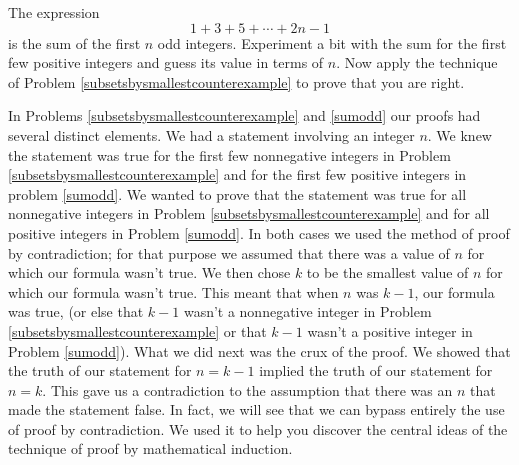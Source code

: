 \item The expression\label{sumodd}
$$1+3+5+\cdots+2n-1$$
is the sum of the first $n$ odd integers.  Experiment a bit with the sum
for the first few positive integers and guess its value in terms of $n$. 
Now apply the technique of Problem
\ref{subsetsbysmallestcounterexample} to prove that you are right.

\ep

In Problems \ref{subsetsbysmallestcounterexample} and \ref{sumodd} our
proofs had several distinct elements.  We had a statement involving an
integer $n$.  We knew the statement was true for the first few
nonnegative integers in Problem \ref{subsetsbysmallestcounterexample} and
for the first few positive integers in problem \ref{sumodd}.  We wanted
to prove that the statement was true for all nonnegative integers in
Problem \ref{subsetsbysmallestcounterexample} and for all positive
integers in Problem \ref{sumodd}.  In both cases we used the method of
proof by contradiction; for that purpose we assumed that there was a value
of
$n$ for which our formula wasn't true.  We then chose $k$ to be the
smallest value of $n$ for which our formula wasn't true.  This meant that
when $n$ was $k-1$, our formula was true, (or else that $k-1 $ wasn't a
nonnegative integer in Problem \ref{subsetsbysmallestcounterexample} or
that $k-1$ wasn't a positive integer in Problem \ref{sumodd}).  What we
did next was the crux of the proof.  We showed that the truth of our
statement for
$n=k-1$ implied the truth of our statement for $n=k$.  This gave us a
contradiction to the assumption that there was an $n$ that made the
statement false.  In fact, we will see that we can bypass entirely the
use of proof by contradiction.  We used it to help you discover the
central ideas of the technique of proof by mathematical induction.

